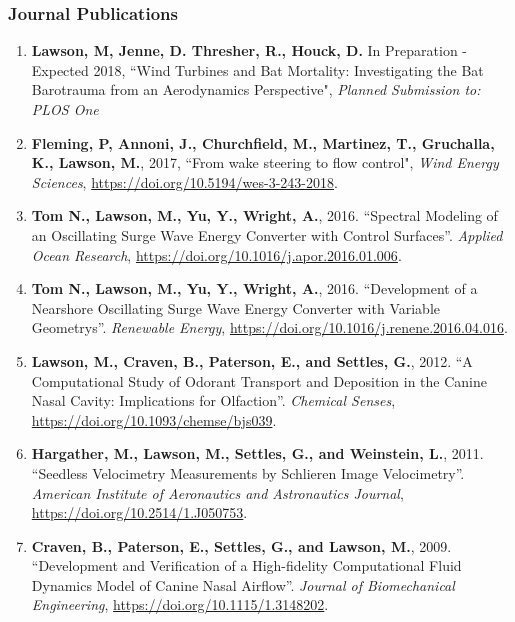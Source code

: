 \subsubsection*{Journal Publications}
\vspace{-0.15in}

\begin{enumerate}[leftmargin=1.5pc,itemsep=0pt,parsep=0pt,topsep=0pt,partopsep=1pt]

\item \textbf{Lawson, M, Jenne, D. Thresher, R., Houck, D.} In Preparation - Expected 2018, ``Wind Turbines and Bat Mortality: Investigating the Bat Barotrauma from an Aerodynamics Perspective", \emph{Planned Submission to: PLOS One}

\item \textbf{Fleming, P, Annoni, J., Churchfield, M., Martinez, T., Gruchalla, K., Lawson, M.}, 2017, ``From wake steering to flow control", \emph{Wind Energy Sciences}, \href{https://doi.org/10.5194/wes-3-243-2018}{https://doi.org/10.5194/wes-3-243-2018}.

\item \textbf{Tom N., Lawson, M., Yu, Y., Wright, A.}, 2016. ``Spectral Modeling of an Oscillating Surge Wave Energy Converter with Control Surfaces''. \emph{Applied Ocean Research}, \href{https://doi.org/10.1016/j.apor.2016.01.006}{https://doi.org/10.1016/j.apor.2016.01.006}.

\item \textbf{Tom N., Lawson, M., Yu, Y., Wright, A.}, 2016. ``Development of a Nearshore Oscillating Surge Wave Energy Converter with Variable Geometrys''. \emph{Renewable Energy}, \href{https://doi.org/10.1016/j.renene.2016.04.016}{https://doi.org/10.1016/j.renene.2016.04.016}.

\item \textbf{Lawson, M., Craven, B., Paterson, E., and Settles, G.}, 2012. ``A Computational Study of Odorant Transport and Deposition in the Canine Nasal Cavity: Implications for Olfaction''. \emph{Chemical Senses}, \href{https://doi.org/10.1093/chemse/bjs039}{https://doi.org/10.1093/chemse/bjs039}.

\item \textbf{Hargather, M., Lawson, M., Settles, G., and Weinstein, L.}, 2011. ``Seedless Velocimetry Measurements by Schlieren Image Velocimetry''. \emph{American Institute of Aeronautics and Astronautics Journal}, \href{https://doi.org/10.2514/1.J050753}{https://doi.org/10.2514/1.J050753}.

\item \textbf{Craven, B., Paterson, E., Settles, G., and Lawson, M.}, 2009. ``Development and Verification of a High-fidelity Computational Fluid Dynamics Model of Canine Nasal Airflow''. \emph{Journal of Biomechanical Engineering}, \href{https://doi.org/10.1115/1.3148202}{https://doi.org/10.1115/1.3148202}.


\end{enumerate}
